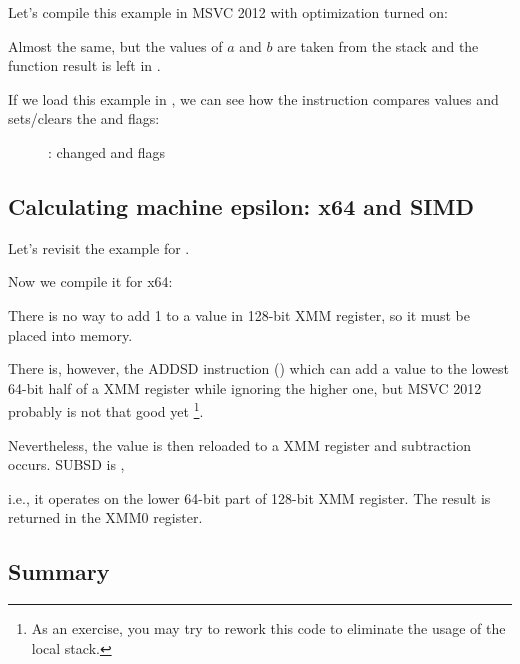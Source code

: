 Let's compile this example in MSVC 2012 with optimization turned on:



Almost the same, but the values of $a$ and $b$ are taken from the stack and the function result 
is left in .

If we load this example in \olly, 
we can see how the  instruction compares values and sets/clears the \CF and \PF flags:

\begin{figure}[H]
\centering
{}
\caption{\olly:  changed \CF and \PF flags}
\label{fig:FPU_SIMD_d_max_olly}
\end{figure}

\subsection{Calculating machine epsilon: x64 and SIMD}
\label{machine_epsilon_x64_and_SIMD}

Let's revisit the  example for \Tdouble {}.

Now we compile it for x64:



There is no way to add 1 to a value in 128-bit XMM register, so it must be placed into memory.

There is, however, the ADDSD instruction () 
which can add a value to the lowest 64-bit half of a XMM register while ignoring the higher one, 
but MSVC 2012 probably is not that good yet
\footnote{As an exercise, you may try to rework this code to 
eliminate the usage of the local stack.}.

Nevertheless, the value is then reloaded to a XMM register and subtraction occurs.
SUBSD is , 

i.e., it operates on the lower 64-bit part of 128-bit XMM register.
The result is returned in the XMM0 register.



\subsection{Summary}

